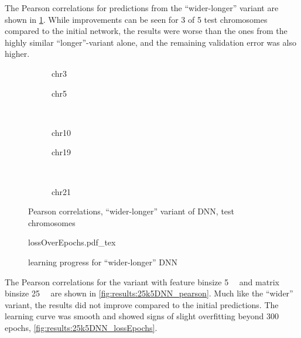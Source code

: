 The Pearson correlations for predictions from the ``wider-longer'' variant are shown in \cref{fig:results:wider-longerDNN_pearson}.
While improvements can be seen for 3 of 5 test chromosomes compared to the initial network, 
the results were worse than the ones from the highly similar ``longer''-variant alone,
and the remaining validation error was also higher.
\begin{figure}[p]
    \begin{subfigure}{0.45\textwidth}
        \scriptsize
        \caption{chr3}
    \end{subfigure} \hfill
    \begin{subfigure}{0.45\textwidth}
        \scriptsize
        \caption{chr5}
    \end{subfigure}\\[5mm]
    \begin{subfigure}{0.45\textwidth}
        \scriptsize
        \caption{chr10}
    \end{subfigure}\hfill
    \begin{subfigure}{0.45\textwidth}
        \scriptsize
        \caption{chr19}
    \end{subfigure}\\[3mm]
    \centering
    \begin{subfigure}{0.45\textwidth}
        \scriptsize
        \caption{chr21}
    \end{subfigure}
    \caption{Pearson correlations, ``wider-longer'' variant of DNN,  test chromosomes}
    \label{fig:results:wider-longerDNN_pearson}
\end{figure}
\begin{figure}[hbp]
 \centering
 \scriptsize
 {lossOverEpochs.pdf_tex}
 \caption{learning progress for ``wider-longer'' DNN} \label{fig:results:wider-longerDNN_lossEpochs}
\end{figure}

The Pearson correlations for the variant with feature binsize \SI{5}{\kilo\bp} and matrix binsize \SI{25}{\kilo\bp}
are shown in \cref{fig:results:25k5DNN_pearson}.
Much like the ``wider'' variant, the results did not improve compared to the initial predictions.
The learning curve was smooth and showed signs of slight overfitting beyond 300 epochs, \cref{fig:results:25k5DNN_lossEpochs}.

